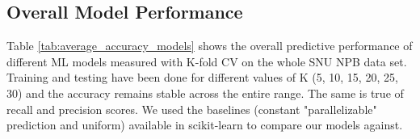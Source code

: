 
\subsection{Overall Model Performance}
\label{evaluation_kfold}
Table \ref{tab:average_accuracy_models} shows the overall predictive performance of different ML models measured with K-fold CV on the whole SNU NPB data set. Training and testing have been done for different values of K (5, 10, 15, 20, 25, 30) and the accuracy remains stable across the entire range. The same is true of recall and precision scores. We used the baselines (constant "parallelizable" prediction and uniform) available in scikit-learn to compare our models against.

